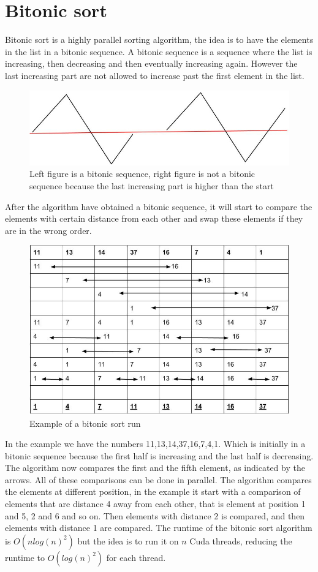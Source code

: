 \section{Bitonic sort}
Bitonic sort is a highly parallel sorting algorithm, the idea is to have the elements in the list in a bitonic sequence. A bitonic sequence is a sequence where the list is increasing, then decreasing and then eventually increasing again. However the last increasing part are not allowed to increase past the first element in the list.
\begin{figure}[H]
    \centering
    \includegraphics[width=0.8\linewidth]{images/bitonicseq}
    \caption[Sequence of elements]{Left figure is a bitonic sequence, right figure is not a bitonic sequence because the last increasing part is higher than the start}\label{fig:bitonicseq}
\end{figure}
After the algorithm have obtained a bitonic sequence, it will start to compare the elements with certain distance from each other and swap these elements if they are in the wrong order.
\begin{figure}[H]
    \centering
    \includegraphics[width=0.8\linewidth]{images/bitonicexample}
    \caption{Example of a bitonic sort run}\label{fig:bitonicex}
\end{figure}
In the example we have the numbers 11,13,14,37,16,7,4,1. Which is initially in a bitonic sequence because the first half is increasing and the last half is decreasing. The algorithm now compares the first and the fifth element, as indicated by the arrows. All of these comparisons can be done in parallel. The algorithm compares the elements at different position, in the example it start with a comparison of elements that are distance 4 away from each other, that is element at position 1 and 5, 2 and 6 and so on. Then elements with distance 2 is compared, and then elements with distance 1 are compared.
The runtime of the bitonic sort algorithm is $O(nlog(n)^2)$ but the idea is to run it on $n$ Cuda threads, reducing the runtime to $O(log(n)^2)$ for each thread.
